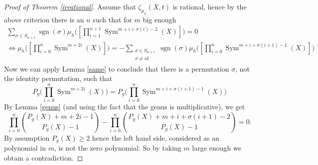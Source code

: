 \documentclass[11pt, a4paper, german]{article}
\theoremstyle{plain}
\theoremstyle{definition}
\DeclareMathOperator{\Sym}{Sym}
\DeclareMathOperator{\sgn}{sgn}
\begin{document}
\begin{proof}[Proof of Theorem \ref{irrational}]
    Assume that $\zeta_{\mu_h}(X,t)$ is rational, hence by the above criterion there is an $n$ such that for $m$ big enough
    \begin{gather*}
        \sum_{\sigma \in S_{n+1}} \sgn(\sigma) \mu_h \Big(\left[ \prod_{i=1}^{n+1} \Sym^{m + i + \sigma(i) - 2}(X)\right]\Big)  = 0 \\ 
            \Leftrightarrow
            \mu_h \Big ( \left[ \prod_{i=0}^n \Sym^{m + 2i}(X) \right] \Big )  = - \sum_{\substack{\sigma \in S_{n+1} \\ \sigma \neq id}} 
            \sgn(\sigma) \mu_h \Big ( \left[\prod_{i=0}^n \Sym^{m + i + \sigma(i+1) - 1}(X) \right]\Big )
    \end{gather*}
    Now we can apply Lemma \ref{same} to conclude that there is a permutation $\sigma$, not the identity permutation, such that
    \[
        P_g \Big(\prod_{i=0}^n \Sym^{m+2i}(X)\Big) = P_g \Big( \prod_{i=0}^n \Sym^{m+i+\sigma(i+1) - 1}(X) \Big)
    \]
    By Lemma \ref{genus} (and using the fact that the genus is multiplicative), we get
    \[
        \prod_{i=0}^n \binom{P_g(X) + m + 2i - 1}{P_g(X) - 1} - \prod_{i=0}^n \binom{P_g(X) + m + i + \sigma(i+1) - 2}{P_g(X) - 1} = 0.
    \]
    By assumption $P_g(X) \geq 2$ hence the left hand side, considered as an polynomial in $m$, is not the zero polynomial. So by taking
    $m$ large enough we obtain a contradiction.
\end{proof}

{}

\end{document}
